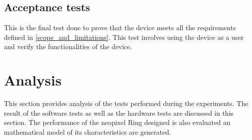 \subsection{Acceptance tests}
This is the final test done to prove that the device meets all the requirements defined in \cref{scope_and_limitations}. This test involves using the device as a user and verify the functionalities of the device. 
\section{Analysis}
This section provides analysis of the tests performed during the experiments. The result of the software tests as well as the hardware tests are discussed in this section. The performance of the neopixel Ring designed is also evaluated an mathematical model of its characteristics are generated.